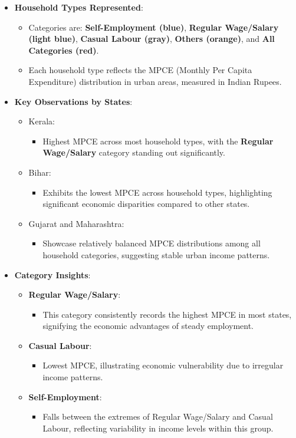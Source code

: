 \documentclass{article}
\begin{document}
\begin{itemize}
	\item \textbf{Household Types Represented}:
	\begin{itemize}
		\item Categories are: \textbf{Self-Employment (blue)}, \textbf{Regular Wage/Salary (light blue)}, \textbf{Casual Labour (gray)}, \textbf{Others (orange)}, and \textbf{All Categories (red)}.
		\item Each household type reflects the MPCE (Monthly Per Capita Expenditure) distribution in urban areas, measured in Indian Rupees.
	\end{itemize}
	\item \textbf{Key Observations by States}:
	\begin{itemize}
		\item Kerala:
		\begin{itemize}
			\item Highest MPCE across most household types, with the \textbf{Regular Wage/Salary} category standing out significantly.
		\end{itemize}
		\item Bihar:
		\begin{itemize}
			\item Exhibits the lowest MPCE across household types, highlighting significant economic disparities compared to other states.
		\end{itemize}
		\item Gujarat and Maharashtra:
		\begin{itemize}
			\item Showcase relatively balanced MPCE distributions among all household categories, suggesting stable urban income patterns.
		\end{itemize}
	\end{itemize}
	\item \textbf{Category Insights}:
	\begin{itemize}
		\item \textbf{Regular Wage/Salary}:
		\begin{itemize}
			\item This category consistently records the highest MPCE in most states, signifying the economic advantages of steady employment.
		\end{itemize}
		\item \textbf{Casual Labour}:
		\begin{itemize}
			\item Lowest MPCE, illustrating economic vulnerability due to irregular income patterns.
		\end{itemize}
		\item \textbf{Self-Employment}:
		\begin{itemize}
			\item Falls between the extremes of Regular Wage/Salary and Casual Labour, reflecting variability in income levels within this group.
		\end{itemize}
	\end{itemize}
\end{itemize}
\end{document}
